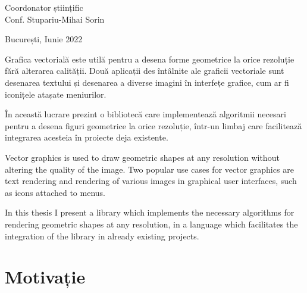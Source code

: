 \documentclass[a4paper, 12pt]{report}
\newenvironment{abstractpage}
  {\cleardoublepage\vspace*{\fill}\thispagestyle{empty}}
  {\vfill\cleardoublepage}
\renewenvironment{abstract}[1]
  {\bigskip\selectlanguage{#1}
   \begin{center}\bfseries\abstractname\end{center}}
  {\par\bigskip}
\begin{document}
\begin{titlepage}
    \vspace{0.25cm}

    \begin{center}
        \large Coordonator științific \\ Conf. Stupariu-Mihai Sorin
    \end{center}

    \vspace{2cm}

    \begin{center}
        \Large București, Iunie 2022
    \end{center}
\end{titlepage}
\makeatother

\tableofcontents

\begin{abstractpage}

    \begin{abstract}{romanian}
        Grafica vectorială este utilă pentru a desena forme geometrice la orice rezoluție fără alterarea calității. Două aplicații des întâlnite
        ale graficii vectoriale sunt desenarea textului și desenarea a diverse imagini în interfețe grafice, cum ar fi iconițele atașate
        meniurilor.

        În această lucrare prezint o bibliotecă care implementează algoritmii necesari pentru a desena figuri geometrice la orice rezoluție,
        într-un limbaj care facilitează integrarea acesteia în proiecte deja existente.
    \end{abstract}

    \begin{abstract}{english}
        Vector graphics is used to draw geometric shapes at any resolution without altering the quality of the image. Two popular use cases
        for vector graphics are text rendering and rendering of various images in graphical user interfaces, such as icons attached to menus.

        In this thesis I present a library which implements the necessary algorithms for rendering geometric shapes at any resolution, in a
        language which facilitates the integration of the library in already existing projects.
    \end{abstract}

\end{abstractpage}

\chapter{Motivație}
\end{document}
